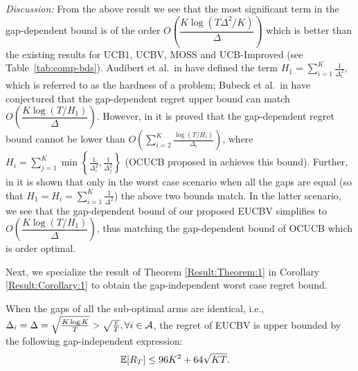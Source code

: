 \emph{Discussion:} From the above result we see that the most significant term in the gap-dependent bound is of the order $O\left(\dfrac{K\log{(T\Delta^{2}/K)}}{\Delta}\right)$ which is better than the existing results for UCB1, UCBV, MOSS and UCB-Improved (see Table~\ref{tab:comp-bds}). Audibert et al.\ in \cite{audibert2010best} have defined the term $H_1=\sum_{i=1}^{K}\frac{1}{\Delta_i^2}$, which is referred to as the hardness of a problem;  Bubeck et al.\ in \cite{bubeck2012regret} have conjectured that the gap-dependent regret upper bound can match $O\left(\dfrac{K\log{(T/H_1)}}{\Delta}\right)$. However, in  \cite{lattimore2015optimally} it is proved that the gap-dependent regret bound cannot be lower than $O\left(\sum_{i=2}^{K}\frac{\log\left(T/H_i\right)}{\Delta_i}\right)$, where $H_i=\sum_{j=1}^{K}\min\left\lbrace \frac{1}{\Delta_i^2},\frac{1}{\Delta_j^2}\right\rbrace$ (OCUCB proposed in \cite{lattimore2015optimally} achieves this bound). Further, in \cite{lattimore2015optimally} it is shown that only in the worst case scenario when all the gaps are equal (so that $H_1=H_{i}=\sum_{i=1}^{K}\frac{1}{\Delta^2}$) the above two bounds match. In the latter scenario, we see that the gap-dependent bound of our proposed EUCBV simplifies to $O\left(\dfrac{K\log{(T/H_1)}}{\Delta}\right)$, thus matching the gap-dependent bound of OCUCB which is order optimal.

Next, we specialize the result of Theorem \ref{Result:Theorem:1} in Corollary \ref{Result:Corollary:1} to  obtain the gap-independent worst case regret bound. %



\begin{corollary}
\label{Result:Corollary:1}
When the gaps of all the sub-optimal arms are identical, i.e., $\Delta_i =\Delta = \sqrt{\frac{K\log K}{T}}>\sqrt{\frac{e}{T}}, \forall i\in \mathcal{A}$, the
regret of EUCBV is upper bounded by the following gap-independent expression:
\begin{align*}
\mathbb{E}[R_{T}] & \leq 96 K^2 + 64\sqrt{KT}.
	\end{align*} 
\end{corollary}

